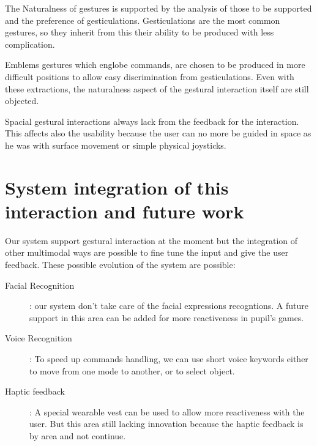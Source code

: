 \documentclass{llncs}
\newcommand\ignore[1]{}
\begin{document}
The Naturalness of gestures is supported by the analysis of those to be
supported and the preference of gesticulations.
Gesticulations are the most common gestures, so they inherit from this their
ability to be produced with less complication.

Emblems gestures which englobe commands, are chosen to be produced in more
difficult positions to allow easy discrimination from gesticulations.
Even with these extractions, the naturalness aspect of the gestural interaction
itself are still objected.  \cite{naturalNorman2010}

Spacial gestural interactions always lack from the feedback for the interaction.
This affects also the usability because the user can no more be guided in space
as he was with surface movement or simple physical joysticks.

\section{System integration of this interaction and future work}

Our system support gestural interaction at the moment but the integration of
other multimodal ways are possible to fine tune the input and give the user
feedback.
These possible evolution of the system are possible:

\begin{description}
 \item[Facial Recognition]: our system don't take care of the facial expressions
recogntions. A future support in this area can be added for more reactiveness in
pupil's games.
 \item[Voice Recognition]: To speed up commands handling, we can use short voice
keywords either to move from one mode to another, or to select object.
 \item[Haptic feedback]: A special wearable vest can be used to allow more
reactiveness with the user. But this area still lacking innovation because the
haptic feedback is by area and not continue.
\end{description}

\ignore{
Gesture + facial recog.
Voice recognition
Haptic 
--
Naturalness came from the analysis of gestures used in talk shows.
(gestures used many times means nature gestures)
Reverse thinking.
Usability in the context of RevTV ??
}


\end{document}
